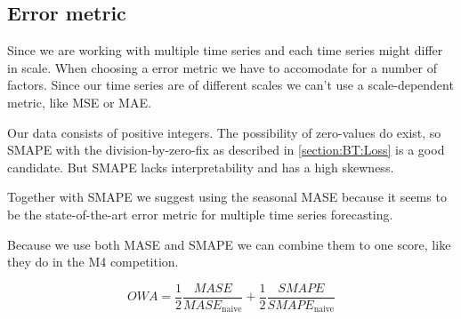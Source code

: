 \subsection{Error metric}



Since we are working with multiple time series and each time series might differ in scale.
When choosing a error metric we have to accomodate for a number of factors.
Since our time series are of different scales we can't use a scale-dependent metric,
like MSE or MAE.

Our data consists of positive integers. The possibility of zero-values do exist,
so SMAPE with the division-by-zero-fix as described in \autoref{section:BT:Loss} is a good candidate.
But SMAPE lacks interpretability and has a high skewness.

Together with SMAPE we suggest using the seasonal MASE because it seems to be the
state-of-the-art error metric for multiple time series forecasting.

Because we use both MASE and SMAPE we can combine them to one score, like
they do in the M4 competition.

\begin{equation}
  \label{eq:OWA}
  OWA = \frac{1}{2} \frac{MASE}{MASE_{\text{naive}}} + \frac{1}{2} \frac{SMAPE}{SMAPE_{\text{naive}}}
\end{equation}
